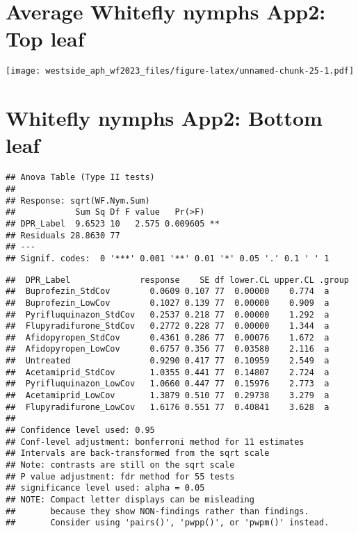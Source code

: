 \documentclass[
]{article}
\begin{document}
\hypertarget{average-whitefly-nymphs-app2-top-leaf}{%
\section{Average Whitefly nymphs App2: Top
leaf}\label{average-whitefly-nymphs-app2-top-leaf}}

\texttt{[image: westside\_aph\_wf2023\_files/figure-latex/unnamed-chunk-25-1.pdf]}

\hypertarget{whitefly-nymphs-app2-bottom-leaf}{%
\section{Whitefly nymphs App2: Bottom
leaf}\label{whitefly-nymphs-app2-bottom-leaf}}

\begin{verbatim}
## Anova Table (Type II tests)
## 
## Response: sqrt(WF.Nym.Sum)
##            Sum Sq Df F value   Pr(>F)   
## DPR_Label  9.6523 10   2.575 0.009605 **
## Residuals 28.8630 77                    
## ---
## Signif. codes:  0 '***' 0.001 '**' 0.01 '*' 0.05 '.' 0.1 ' ' 1
\end{verbatim}

\begin{verbatim}
##  DPR_Label              response    SE df lower.CL upper.CL .group
##  Buprofezin_StdCov        0.0609 0.107 77  0.00000    0.774  a    
##  Buprofezin_LowCov        0.1027 0.139 77  0.00000    0.909  a    
##  Pyrifluquinazon_StdCov   0.2537 0.218 77  0.00000    1.292  a    
##  Flupyradifurone_StdCov   0.2772 0.228 77  0.00000    1.344  a    
##  Afidopyropen_StdCov      0.4361 0.286 77  0.00076    1.672  a    
##  Afidopyropen_LowCov      0.6757 0.356 77  0.03580    2.116  a    
##  Untreated                0.9290 0.417 77  0.10959    2.549  a    
##  Acetamiprid_StdCov       1.0355 0.441 77  0.14807    2.724  a    
##  Pyrifluquinazon_LowCov   1.0660 0.447 77  0.15976    2.773  a    
##  Acetamiprid_LowCov       1.3879 0.510 77  0.29738    3.279  a    
##  Flupyradifurone_LowCov   1.6176 0.551 77  0.40841    3.628  a    
## 
## Confidence level used: 0.95 
## Conf-level adjustment: bonferroni method for 11 estimates 
## Intervals are back-transformed from the sqrt scale 
## Note: contrasts are still on the sqrt scale 
## P value adjustment: fdr method for 55 tests 
## significance level used: alpha = 0.05 
## NOTE: Compact letter displays can be misleading
##       because they show NON-findings rather than findings.
##       Consider using 'pairs()', 'pwpp()', or 'pwpm()' instead.
\end{verbatim}
\end{document}
